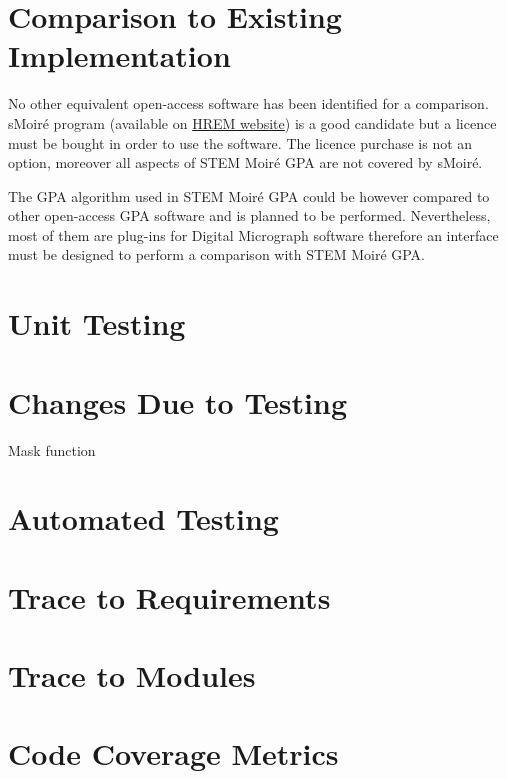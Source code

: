 \documentclass[12pt, titlepage]{article}
\newcommand{\progname}{STEM Moir{\'e} GPA}
\begin{document}
\section{Comparison to Existing Implementation}	

No other equivalent open-access software has been identified for a comparison. sMoir{\'e} program (available on \href{https://www.hremresearch.com/}{HREM website}) is a good candidate but a licence must be bought in order to use the software. The licence purchase is not an option, moreover all aspects of \progname{} are not covered by sMoir{\'e}.

The GPA algorithm used in \progname{} could be however compared to other open-access GPA software and is planned to be performed. Nevertheless, most of them are plug-ins for Digital Micrograph software therefore an interface must be designed to perform a comparison with \progname{}. 

\section{Unit Testing}



\section{Changes Due to Testing}

Mask function 

\section{Automated Testing}
		
\section{Trace to Requirements}
		
\section{Trace to Modules}		

\section{Code Coverage Metrics}




\end{document}
